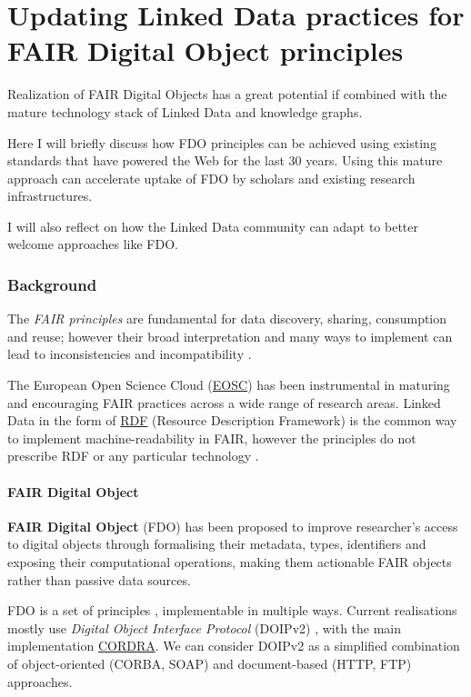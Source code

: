 \section{Updating Linked Data practices for FAIR Digital Object
principles}
\label{ch2:updating-linked-data-practices-for-fair-digital-object-principles}

Realization of FAIR Digital Objects has a great potential if combined with the mature technology stack of Linked Data and knowledge graphs.

Here I will briefly discuss how FDO principles can be achieved using existing standards that have powered the Web for the last 30 years. Using this mature approach can accelerate uptake of FDO by scholars and existing research infrastructures.

I will also reflect on how the Linked Data community can adapt to better welcome approaches like FDO.

\subsubsection{Background}
\label{ch2:background}

The \emph{FAIR principles} \cite{Wilkinson 2016} are
fundamental for data discovery, sharing, consumption and reuse; however
their broad interpretation and many ways to implement can lead to
inconsistencies and incompatibility
\cite{Jacobsen 2020}.

The European Open Science Cloud (\href{https://www.eosc.eu/}{EOSC}) has
been instrumental in maturing and encouraging FAIR practices across a
wide range of research areas. Linked Data in the form of
\href{https://www.w3.org/TR/rdf11-primer/}{RDF} (Resource Description
Framework) is the common way to implement machine-readability in FAIR,
however the principles do not prescribe RDF or any particular technology
\cite{Mons 2017}.

\paragraph{FAIR Digital Object}
\label{ch2:fair-digital-object}

\textbf{FAIR Digital Object} (FDO)
\cite{Schultes 2019}
has been proposed to improve researcher's access to digital objects
through formalising their metadata, types, identifiers and exposing
their computational operations, making them actionable FAIR objects
rather than passive data sources.

FDO is a set of principles \cite{bonino2019}, implementable in multiple ways. Current realisations mostly
use \emph{Digital Object Interface Protocol} (DOIPv2)
\cite{DONA 2018}, with the
main implementation
\href{https://www.cordra.org/documentation/api/doip.html}{CORDRA}. We
can consider DOIPv2 as a simplified combination of object-oriented
(CORBA, SOAP) and document-based (HTTP, FTP) approaches.

